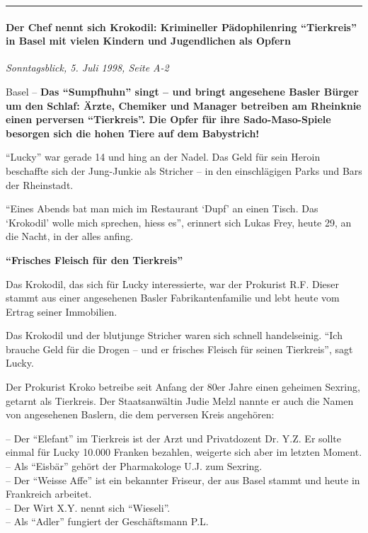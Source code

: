 \begin{center}\rule{0.5\linewidth}{\linethickness}\end{center}

\hypertarget{der-chef-nennt-sich-krokodil-krimineller-puxe4dophilenring-tierkreis-in-basel-mit-vielen-kindern-und-jugendlichen-als-opfern}{%
\paragraph{Der Chef nennt sich Krokodil: Krimineller Pädophilenring
``Tierkreis'' in Basel mit vielen Kindern und Jugendlichen als
Opfern}\label{der-chef-nennt-sich-krokodil-krimineller-puxe4dophilenring-tierkreis-in-basel-mit-vielen-kindern-und-jugendlichen-als-opfern}}

\emph{Sonntagsblick, 5. Juli 1998, Seite A-2}

Basel -- \textbf{Das ``Sumpfhuhn'' singt -- und bringt angesehene Basler
Bürger um den Schlaf: Ärzte, Chemiker und Manager betreiben am Rheinknie
einen perversen ``Tierkreis''. Die Opfer für ihre Sado-Maso-Spiele
besorgen sich die hohen Tiere auf dem Babystrich!}

``Lucky'' war gerade 14 und hing an der Nadel. Das Geld für sein Heroin
beschaffte sich der Jung-Junkie als Stricher -- in den einschlägigen
Parks und Bars der Rheinstadt.

``Eines Abends bat man mich im Restaurant `Dupf' an einen Tisch. Das
`Krokodil' wolle mich sprechen, hiess es'', erinnert sich Lukas Frey,
heute 29, an die Nacht, in der alles anfing.

\textbf{``Frisches Fleisch für den Tierkreis''}

Das Krokodil, das sich für Lucky interessierte, war der Prokurist R.F.
Dieser stammt aus einer angesehenen Basler Fabrikantenfamilie und lebt
heute vom Ertrag seiner Immobilien.

Das Krokodil und der blutjunge Stricher waren sich schnell handelseinig.
``Ich brauche Geld für die Drogen -- und er frisches Fleisch für seinen
Tierkreis'', sagt Lucky.

Der Prokurist Kroko betreibe seit Anfang der 80er Jahre einen geheimen
Sexring, getarnt als Tierkreis. Der Staatsanwältin Judie Melzl nannte er
auch die Namen von angesehenen Baslern, die dem perversen Kreis
angehören:

-- Der ``Elefant'' im Tierkreis ist der Arzt und Privatdozent Dr. Y.Z.
Er sollte einmal für Lucky 10.000 Franken bezahlen, weigerte sich aber
im letzten Moment.\\
-- Als ``Eisbär'' gehört der Pharmakologe U.J. zum Sexring.\\
-- Der ``Weisse Affe'' ist ein bekannter Friseur, der aus Basel stammt
und heute in Frankreich arbeitet.\\
-- Der Wirt X.Y. nennt sich ``Wieseli''.\\
-- Als ``Adler'' fungiert der Geschäftsmann P.L.

